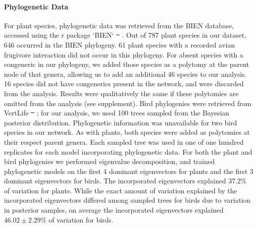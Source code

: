 \documentclass[num-refs]{article}%
\providecommand{\DIFadd}[1]{{\protect\color{blue}\uwave{#1}}} %
\providecommand{\DIFdel}[1]{{\protect\color{red}\sout{#1}}}                      %
\providecommand{\DIFaddbegin}{} %
\providecommand{\DIFaddend}{} %
\providecommand{\DIFdelbegin}{} %
\providecommand{\DIFdelend}{} %
\newcommand{\DIFscaledelfig}{0.5}
\newlength{\DIFdelgraphicswidth} %
\newlength{\DIFdelgraphicsheight} %
\newcommand{\DIFaddincludegraphics}[2][]{{\color{blue}\fbox{\DIFOincludegraphics[#1]{#2}}}} %
\newcommand{\DIFdelincludegraphics}[2][]{%
\sbox{\DIFdelgraphicsbox}{\DIFOincludegraphics[#1]{#2}}%
\settoboxwidth{\DIFdelgraphicswidth}{\DIFdelgraphicsbox} %
\settoboxtotalheight{\DIFdelgraphicsheight}{\DIFdelgraphicsbox} %
\scalebox{\DIFscaledelfig}{%
\parbox[b]{\DIFdelgraphicswidth}{\usebox{\DIFdelgraphicsbox}\\[-\baselineskip] \rule{\DIFdelgraphicswidth}{0em}}\llap{\resizebox{\DIFdelgraphicswidth}{\DIFdelgraphicsheight}{%
\setlength{\unitlength}{\DIFdelgraphicswidth}%
\begin{picture}(1,1)%
\thicklines\linethickness{2pt} %
{\color[rgb]{1,0,0}\put(0,0){\framebox(1,1){}}}%
{\color[rgb]{1,0,0}\put(0,0){\line( 1,1){1}}}%
{\color[rgb]{1,0,0}\put(0,1){\line(1,-1){1}}}%
\end{picture}%
}\hspace*{3pt}}} %
} %
\DeclareRobustCommand{\DIFaddbegin}{\DIFOaddbegin \let\includegraphics\DIFaddincludegraphics} %
\DeclareRobustCommand{\DIFaddend}{\DIFOaddend \let\includegraphics\DIFOincludegraphics} %
\DeclareRobustCommand{\DIFdelbegin}{\DIFOdelbegin \let\includegraphics\DIFdelincludegraphics} %
\DeclareRobustCommand{\DIFdelend}{\DIFOaddend \let\includegraphics\DIFOincludegraphics} %
\begin{document}
\paragraph{Phylogenetic Data}
For plant species, phylogenetic data was retrieved from the BIEN database, accessed using the r package `BIEN` \DIFdelbegin \DIFdel{\mbox{%
\cite{maitner2018bien}}\hspace{0pt}%
}\DIFdelend \DIFaddbegin \DIFadd{\mbox{%
\citep{maitner2018bien}}\hspace{0pt}%
}\DIFaddend . Out of 787 plant species in our dataset, 646 occurred in the BIEN phylogeny. 61 plant species with a recorded avian frugivore interaction did not occur in this phylogeny. For absent species with a congeneric in our phylogeny, we added those species as a polytomy at the parent node of that genera, allowing us to add an additional 46 species to our analysis. 16 species did not have congenerics present in the network, and were discarded from the analysis. Results were qualitatively the same if these polytomies are omitted from the analysis (see supplement). Bird phylogenies were retrieved from VertLife \DIFdelbegin \DIFdel{\mbox{%
\cite{jetz2012}}\hspace{0pt}%
}\DIFdelend \DIFaddbegin \DIFadd{\mbox{%
\citep{jetz2012}}\hspace{0pt}%
}\DIFaddend ; for our analysis, we used 100 trees sampled from the Bayesian posterior distribution. Phylogenetic information was unavailable for two bird species in our network. As with plants, both species were added as polytomies at their respect parent genera. Each sampled tree was used in one of one hundred replicates for each model incorporating phylogenetic data. For both the plant and bird phylogenies we performed eigenvalue decomposition, and trained phylogenetic models on the first 4 dominant eigenvectors for plants and the first 3 dominant eigenvectors for birds. The incorporated eigenvectors explained 37.2\% of variation for plants. While the exact amount of variation explained by the incorporated eigenvectors differed among sampled trees for birds due to variation in posterior samples, on average the incorporated eigenvectors explained $46.02\pm 2.29\%$ of variation for birds. 
\end{document}

